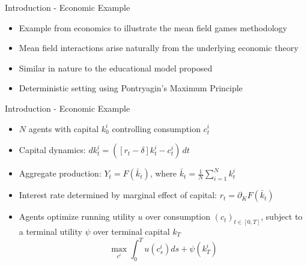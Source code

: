 \documentclass{beamer}
\begin{document}
\begin{frame}{Introduction - Economic Example}
\begin{itemize}
    \item Example from economics to illustrate the mean field games methodology
    \item Mean field interactions arise naturally from the underlying economic theory
    \item Similar in nature to the educational model proposed
    \item Deterministic setting using Pontryagin's Maximum Principle
\end{itemize}
\end{frame}

\begin{frame}{Introduction - Economic Example}
\begin{itemize}
    \item $N$ agents with capital $k_0^i$ controlling consumption $c_t^i$
    \item Capital dynamics: $ d k_t^i = \left( \left[r_t - \delta \right] k_t^i - c_t^i \right)\, dt$
    \item Aggregate production: $Y_t = F(\bar k_t)$, where $\bar k_t = \frac{1}{N} \sum_{i = 1}^N k_t^i$
    \item Interest rate determined by marginal effect of capital: $r_t = \partial_K F(\bar k_t)$
    \item Agents optimize running utility $u$ over consumption $(c_t)_{t \in [0,T]}$, subject to a terminal utility $\psi$ over terminal capital $k_T$
    \begin{equation}
        \max_{c^i } \int_0^T u(c^i_s) ds + \psi(k^i_T)
    \end{equation}
\end{itemize}
\end{frame}
\end{document}
